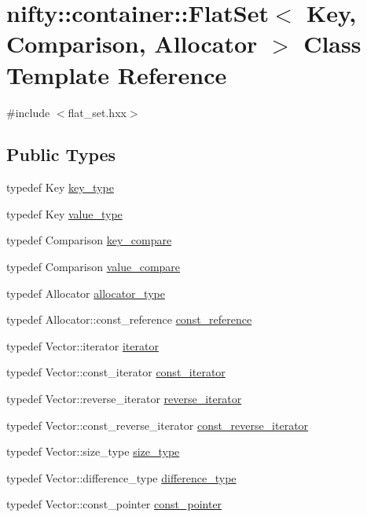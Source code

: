 \hypertarget{classnifty_1_1container_1_1FlatSet}{}\section{nifty\+:\+:container\+:\+:Flat\+Set$<$ Key, Comparison, Allocator $>$ Class Template Reference}
\label{classnifty_1_1container_1_1FlatSet}


{\ttfamily \#include $<$flat\+\_\+set.\+hxx$>$}

\subsection*{Public Types}
\begin{DoxyCompactItemize}
\item 
typedef Key \hyperlink{classnifty_1_1container_1_1FlatSet_a0101a4574052389646be8d9bf092a949}{key\+\_\+type}
\item 
typedef Key \hyperlink{classnifty_1_1container_1_1FlatSet_a2366c665ec49d585ff8a77362468d82d}{value\+\_\+type}
\item 
typedef Comparison \hyperlink{classnifty_1_1container_1_1FlatSet_ab88802e81d77a08a7a74e8ba9d2083c7}{key\+\_\+compare}
\item 
typedef Comparison \hyperlink{classnifty_1_1container_1_1FlatSet_a4ec0fabbb2d2f25b985c12581c576384}{value\+\_\+compare}
\item 
typedef Allocator \hyperlink{classnifty_1_1container_1_1FlatSet_aafc00d7d957c81f01ee8cd5dcabb4c78}{allocator\+\_\+type}
\item 
typedef Allocator\+::const\+\_\+reference \hyperlink{classnifty_1_1container_1_1FlatSet_a9fc6932b53d6a86ec15830e31805f8d4}{const\+\_\+reference}
\item 
typedef Vector\+::iterator \hyperlink{classnifty_1_1container_1_1FlatSet_a9c7fd20cd6b1878ccb8a7e068072c795}{iterator}
\item 
typedef Vector\+::const\+\_\+iterator \hyperlink{classnifty_1_1container_1_1FlatSet_a0f4cd26da060859b18742abfd534aa24}{const\+\_\+iterator}
\item 
typedef Vector\+::reverse\+\_\+iterator \hyperlink{classnifty_1_1container_1_1FlatSet_a5ad537835e3b8911ac1beed1a95d3ac2}{reverse\+\_\+iterator}
\item 
typedef Vector\+::const\+\_\+reverse\+\_\+iterator \hyperlink{classnifty_1_1container_1_1FlatSet_ab7858d2e6eeeb311e21988d9b4a5b802}{const\+\_\+reverse\+\_\+iterator}
\item 
typedef Vector\+::size\+\_\+type \hyperlink{classnifty_1_1container_1_1FlatSet_a06ddeba4c1be37279497ed698dfeb812}{size\+\_\+type}
\item 
typedef Vector\+::difference\+\_\+type \hyperlink{classnifty_1_1container_1_1FlatSet_a84e65d3e380dc5d376c9176780333700}{difference\+\_\+type}
\item 
typedef Vector\+::const\+\_\+pointer \hyperlink{classnifty_1_1container_1_1FlatSet_a87a82a407ecc181303e62a86b3132e38}{const\+\_\+pointer}
\end{DoxyCompactItemize}
